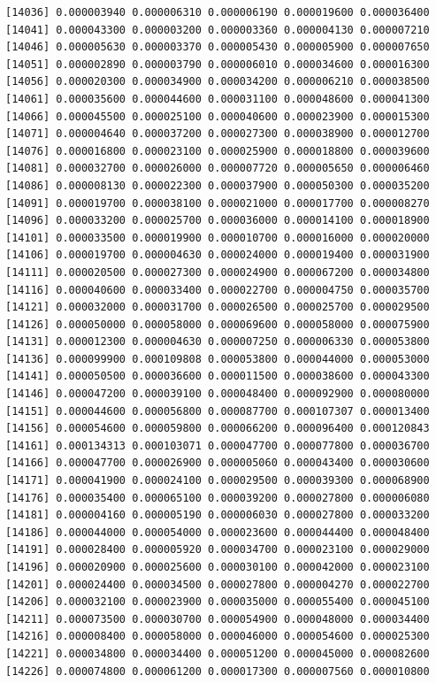 \documentclass[]{article}
\begin{document}
\begin{verbatim}
[14036] 0.000003940 0.000006310 0.000006190 0.000019600 0.000036400
[14041] 0.000043300 0.000003200 0.000003360 0.000004130 0.000007210
[14046] 0.000005630 0.000003370 0.000005430 0.000005900 0.000007650
[14051] 0.000002890 0.000003790 0.000006010 0.000034600 0.000016300
[14056] 0.000020300 0.000034900 0.000034200 0.000006210 0.000038500
[14061] 0.000035600 0.000044600 0.000031100 0.000048600 0.000041300
[14066] 0.000045500 0.000025100 0.000040600 0.000023900 0.000015300
[14071] 0.000004640 0.000037200 0.000027300 0.000038900 0.000012700
[14076] 0.000016800 0.000023100 0.000025900 0.000018800 0.000039600
[14081] 0.000032700 0.000026000 0.000007720 0.000005650 0.000006460
[14086] 0.000008130 0.000022300 0.000037900 0.000050300 0.000035200
[14091] 0.000019700 0.000038100 0.000021000 0.000017700 0.000008270
[14096] 0.000033200 0.000025700 0.000036000 0.000014100 0.000018900
[14101] 0.000033500 0.000019900 0.000010700 0.000016000 0.000020000
[14106] 0.000019700 0.000004630 0.000024000 0.000019400 0.000031900
[14111] 0.000020500 0.000027300 0.000024900 0.000067200 0.000034800
[14116] 0.000040600 0.000033400 0.000022700 0.000004750 0.000035700
[14121] 0.000032000 0.000031700 0.000026500 0.000025700 0.000029500
[14126] 0.000050000 0.000058000 0.000069600 0.000058000 0.000075900
[14131] 0.000012300 0.000004630 0.000007250 0.000006330 0.000053800
[14136] 0.000099900 0.000109808 0.000053800 0.000044000 0.000053000
[14141] 0.000050500 0.000036600 0.000011500 0.000038600 0.000043300
[14146] 0.000047200 0.000039100 0.000048400 0.000092900 0.000080000
[14151] 0.000044600 0.000056800 0.000087700 0.000107307 0.000013400
[14156] 0.000054600 0.000059800 0.000066200 0.000096400 0.000120843
[14161] 0.000134313 0.000103071 0.000047700 0.000077800 0.000036700
[14166] 0.000047700 0.000026900 0.000005060 0.000043400 0.000030600
[14171] 0.000041900 0.000024100 0.000029500 0.000039300 0.000068900
[14176] 0.000035400 0.000065100 0.000039200 0.000027800 0.000006080
[14181] 0.000004160 0.000005190 0.000006030 0.000027800 0.000033200
[14186] 0.000044000 0.000054000 0.000023600 0.000044400 0.000048400
[14191] 0.000028400 0.000005920 0.000034700 0.000023100 0.000029000
[14196] 0.000020900 0.000025600 0.000030100 0.000042000 0.000023100
[14201] 0.000024400 0.000034500 0.000027800 0.000004270 0.000022700
[14206] 0.000032100 0.000023900 0.000035000 0.000055400 0.000045100
[14211] 0.000073500 0.000030700 0.000054900 0.000048000 0.000034400
[14216] 0.000008400 0.000058000 0.000046000 0.000054600 0.000025300
[14221] 0.000034800 0.000034400 0.000051200 0.000045000 0.000082600
[14226] 0.000074800 0.000061200 0.000017300 0.000007560 0.000010800

\end{verbatim}
\end{document}
